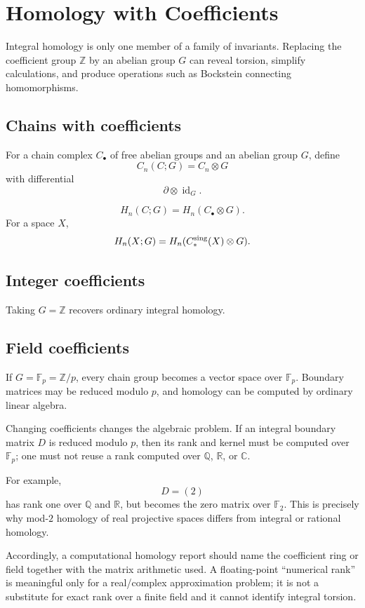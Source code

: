 ﻿\chapter{Homology with Coefficients}
\label{ch:viii25-homology-coefficients}

Integral homology is only one member of a family of invariants.  Replacing the
coefficient group \(\mathbb Z\) by an abelian group \(G\) can reveal torsion,
simplify calculations, and produce operations such as Bockstein connecting
homomorphisms.

\section{Chains with coefficients}
For a chain complex \(C_\bullet\) of free abelian groups and an abelian group
\(G\), define
\[
C_n(C;G)=C_n\otimes G
\]
with differential
\[
\partial\otimes\operatorname{id}_G.
\]

\begin{definition}
\label{def:viii25-coefficients}
\[
H_n(C;G)=H_n(C_\bullet\otimes G).
\]
For a space \(X\),
\[
H_n(X;G)=H_n(C_*^{\rm sing}(X)\otimes G).
\]
\end{definition}

\section{Integer coefficients}
Taking \(G=\mathbb Z\) recovers ordinary integral homology.

\section{Field coefficients}
If \(G=\mathbb F_p=\mathbb Z/p\), every chain group becomes a vector space over
\(\mathbb F_p\).  Boundary matrices may be reduced modulo \(p\), and homology
can be computed by ordinary linear algebra.

\begin{remark}
Changing coefficients changes the algebraic problem.  If an integral boundary
matrix \(D\) is reduced modulo \(p\), then its rank and kernel must be computed
over \(\mathbb F_p\); one must not reuse a rank computed over
\(\mathbb Q\), \(\mathbb R\), or \(\mathbb C\).

For example,
\[
D=(2)
\]
has rank one over \(\mathbb Q\) and \(\mathbb R\), but becomes the zero matrix
over \(\mathbb F_2\).  This is precisely why mod-\(2\) homology of real
projective spaces differs from integral or rational homology.

Accordingly, a computational homology report should name the coefficient ring
or field together with the matrix arithmetic used.  A floating-point
``numerical rank'' is meaningful only for a real/complex approximation
problem; it is not a substitute for exact rank over a finite field and it
cannot identify integral torsion.
\end{remark}

